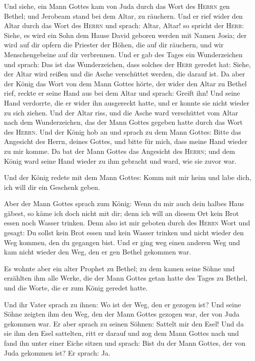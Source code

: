  Und siehe, ein Mann Gottes kam von Juda durch das Wort
des \textsc{Herrn} gen Bethel; und Jerobeam stand bei dem Altar, zu
räuchern.  Und er rief wider den Altar durch das Wort des
\textsc{Herrn} und sprach: Altar, Altar! so spricht der \textsc{Herr}:
Siehe, es wird ein Sohn dem Hause David geboren werden mit Namen Josia;
der wird auf dir opfern die Priester der Höhen, die auf dir räuchern,
und wir Menschengebeine auf dir verbrennen.  Und er gab
des Tages ein Wunderzeichen und sprach: Das ist das Wunderzeichen, dass
solches der \textsc{Herr} geredet hat: Siehe, der Altar wird reißen und
die Asche verschüttet werden, die darauf ist.  Da aber der
König das Wort von dem Mann Gottes hörte, der wider den Altar zu Bethel
rief, reckte er seine Hand aus bei dem Altar und sprach: Greift ihn! Und
seine Hand verdorrte, die er wider ihn ausgereckt hatte, und er konnte
sie nicht wieder zu sich ziehen.  Und der Altar riss, und
die Asche ward verschüttet vom Altar nach dem Wunderzeichen, das der
Mann Gottes gegeben hatte durch das Wort des \textsc{Herrn}.
 Und der König hob an und sprach zu dem Mann Gottes: Bitte
das Angesicht des Herrn, deines Gottes, und bitte für mich, dass meine
Hand wieder zu mir komme. Da bat der Mann Gottes das Angesicht des
\textsc{Herrn}; und dem König ward seine Hand wieder zu ihm gebracht und
ward, wie sie zuvor war.

 Und der König redete mit dem Mann Gottes: Komm mit mir
heim und labe dich, ich will dir ein Geschenk geben.

 Aber der Mann Gottes sprach zum König: Wenn du mir auch
dein halbes Haus gäbest, so käme ich doch nicht mit dir; denn ich will
an diesem Ort kein Brot essen noch Wasser trinken.  Denn
also ist mir geboten durch des \textsc{Herrn} Wort und gesagt: Du sollst
kein Brot essen und kein Wasser trinken und nicht wieder den Weg kommen,
den du gegangen bist.  Und er ging weg einen anderen Weg
und kam nicht wieder den Weg, den er gen Bethel gekommen war.

 Es wohnte aber ein alter Prophet zu Bethel; zu dem kamen
seine Söhne und erzählten ihm alle Werke, die der Mann Gottes getan
hatte des Tages zu Bethel, und die Worte, die er zum König geredet
hatte.

 Und ihr Vater sprach zu ihnen: Wo ist der Weg, den er
gezogen ist? Und seine Söhne zeigten ihm den Weg, den der Mann Gottes
gezogen war, der von Juda gekommen war.  Er aber sprach
zu seinen Söhnen: Sattelt mir den Esel! Und da sie ihm den Esel
sattelten, ritt er darauf  und zog dem Mann Gottes nach
und fand ihn unter einer Eiche sitzen und sprach: Bist du der Mann
Gottes, der von Juda gekommen ist? Er sprach: Ja.

